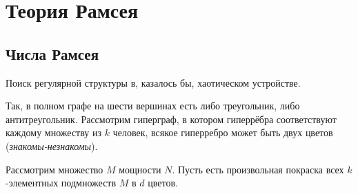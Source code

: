 \documentclass[a4paper]{report}
\begin{document}
    \section{Теория Рамсея}

    \subsection{Числа Рамсея}
    Поиск регулярной структуры в, казалось бы, хаотическом устройстве.

    Так, в полном графе на шести вершинах есть либо треугольник, либо антитреугольник.
    \ok
    Рассмотрим гиперграф, в котором гиперрёбра соответствуют каждому множеству из $k$ человек, всякое гиперребро может быть двух цветов (\emph{знакомы-незнакомы}).

    Рассмотрим множество $M$ мощности $N$.
    Пусть есть произвольная покраска всех $k$-элементных подмножеств $M$ в $d$ цветов.
\end{document}
